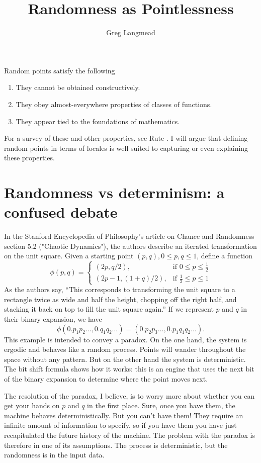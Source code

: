 \documentclass[12pt]{article}
\title{Randomness as Pointlessness}
\author{Greg Langmead}
\begin{document}
\maketitle
Random points satisfy the following
\begin{enumerate}
\item They cannot be obtained constructively.
\item They obey almost-everywhere properties of classes of functions.
\item They appear tied to the foundations of mathematics.
\end{enumerate}
For a survey of these and other properties, see Rute \cite{rute}. I will argue that defining random points in terms of locales is well suited to capturing or even explaining these properties.
\section{Randomness vs determinism: a confused debate}
In the Stanford Encyclopedia of Philosophy's article on Chance and Randomness \cite{sep-chance-randomness} section 5.2 ("Chaotic Dynamics"), the authors describe an iterated transformation on the unit square. Given a starting point $(p,q), 0\leq p, q\leq 1$, define a function
\[
\phi(p,q) =
 \begin{cases}
 (2p, q/2), & \text{if } 0 \le p \le \frac{1}{2} \\
 (2p-1,(1+q)/2), & \text{if } \frac{1}{2} \le p \le 1
 \end{cases}
 \]
As the authors say, ``This corresponds to transforming the unit square to a rectangle twice as wide and half the height, chopping off the right half, and stacking it back on top to fill the unit square again.'' If we represent $p$ and $q$ in their binary expansion, we have \[ \phi (0.p_1 p_2\ldots, 0.q_1 q_2\ldots) = (0.p_2 p_3\ldots , 0.p_1 q_1 q_2\ldots).\]
This example is intended to convey a paradox. On the one hand, the system is ergodic and behaves like a random process. Points will wander throughout the space without any pattern. But on the other hand the system is deterministic. The bit shift formula shows how it works: this is an engine that uses the next bit of the binary expansion to determine where the point moves next.

The resolution of the paradox, I believe, is to worry more about whether you can get your hands on $p$ and $q$ in the first place. Sure, once you have them, the machine behaves deterministically. But you can't have them! They require an infinite amount of information to specify, so if you have them you have just recapitulated the future history of the machine. The problem with the paradox is therefore in one of its assumptions. The process is deterministic, but the randomness is in the input data.
\end{document}
